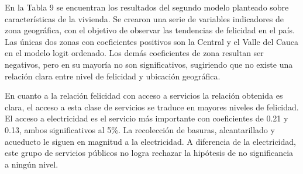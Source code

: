 \documentclass[12pt,spanish]{article}
\begin{document}
En la Tabla 9 se encuentran los resultados del segundo modelo planteado sobre características de la vivienda. Se crearon una serie de variables indicadores de zona geográfica, con el objetivo de observar las tendencias de felicidad en el país. Las únicas dos zonas con coeficientes positivos son la Central y el Valle del Cauca en el modelo logit ordenado. Los demás coeficientes de zona resultan ser negativos, pero en su mayoría no son significativos, sugiriendo que no existe una relación clara entre nivel de felicidad y ubicación geográfica. 

En cuanto a la relación felicidad con acceso a servicios la relación obtenida es clara, el acceso a esta clase de servicios se traduce en mayores niveles de felicidad. El acceso a electricidad es el servicio más importante con coeficientes de 0.21 y 0.13, ambos significativos al 5\%. La recolección de basuras, alcantarillado y acueducto le siguen en magnitud a la electricidad.  A diferencia de la electricidad, este grupo de servicios públicos no logra rechazar la hipótesis de no significancia a ningún nivel. 
\end{document}
